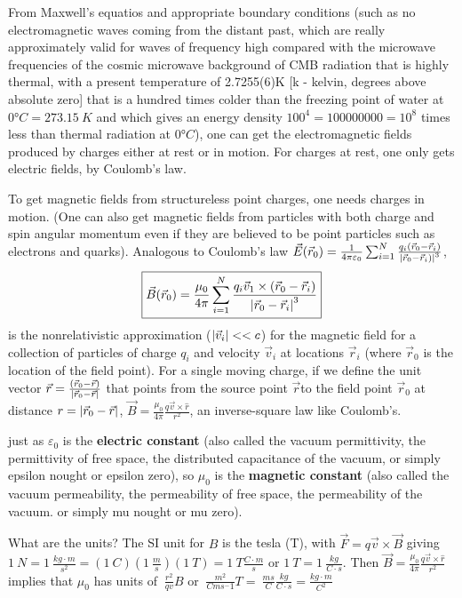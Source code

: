 From Maxwell's equatios and appropriate boundary conditions (such as no electromagnetic waves coming from the distant past, which are really approximately valid for waves of frequency high compared with the microwave frequencies of the cosmic microwave background of CMB radiation that is highly thermal, with a present temperature of 2.7255(6)K [k - kelvin, degrees above absolute zero] that is a hundred times colder than the freezing point of water at $\ang{0}C = \SI{273.15}{K}$ and which gives an energy density $100^4 = 100000000 = 10^8$ times less than thermal radiation at $\ang{0}C$), one can get the electromagnetic fields produced by charges either at rest or in motion. For charges at rest, one only gets electric fields, by Coulomb's law.

To get magnetic fields from structureless point charges, one needs charges in motion. (One can also get magnetic fields from particles with both charge and spin angular momentum even if they are believed to be point particles such as electrons and quarks). Analogous to Coulomb's law
$\vec{E}(\vec{r}_0) = \frac{1}{4 \pi \varepsilon_0} \sum_{i = 1}^{N} \frac{q_i(\vec{r}_0 - \vec{r}_i)}{\left| \vec{r}_0 - \vec{r}_i) \right|^3}$,
\begin{equation}
 \boxed{\vec{B}(\vec{r}_0) = \frac{\mu_0}{4 \pi} \sum_{i = 1}^{N} \frac{q_i \vec{v}_1 \times (\vec{r}_0 - \vec{r}_i)}{\left| \vec{r}_0 - \vec{r}_i \right|^3}}
 \end{equation} 
is the nonrelativistic approximation ($\left| \vec{v}_i \right| << c$) for the magnetic field for a collection of particles of charge $q_i$ and velocity $\vec{v}_i$ at locations $\vec{r}_i$ (where $\vec{r}_0$ is the location of the field point). For a single moving charge, if we define the unit vector $\vec{r} = \frac{(\vec{r}_0 - \vec{r})}{\left| \vec{r}_0 - \vec{r} \right|}$ that points from the source point $\vec{r}$to the field point $\vec{r}_0$ at distance $r = \left| \vec{r}_0 - \vec{r} \right|$, $\vec{B} = \frac{\mu_0}{4\pi} \frac{q\vec{v} \times \hat{r}}{r^2}$, an inverse-square law like Coulomb's.

just as $\varepsilon_0$ is the \textbf{electric constant} (also called the vacuum permittivity, the permittivity of free space, the distributed capacitance of the vacuum, or simply epsilon nought or epsilon zero), so $\mu_0$ is the \textbf{magnetic constant} (also called the vacuum permeability, the permeability of free space, the permeability of the vacuum. or simply mu nought or mu zero).

What are the units? The SI unit for $B$ is the tesla (T), with $\vec{F} = q \vec{v} \times \vec{B}$ giving $\SI{1}{N} = \SI{1}{\frac{kg \cdot m}{s^2}} = (\SI{1}{C})(\SI{1}{\frac{m}{s}})(\SI{1}{T}) = \SI{1}{T\frac{C \cdot m}{s}}$ or $\SI{1}{T} = \SI{1}{\frac{kg}{C \cdot s}}$. Then $\vec{B} = \frac{\mu_0}{4 \pi}\frac{q \vec{v} \times \hat{r}}{r^2}$ implies that $\mu_0$ has units of $\SI{}{\frac{r^2}{qv}B}$ or $\SI{}{\frac{m^2}{Cms^-1}T} = \SI{}{\frac{ms}{C} \frac{kg}{C \cdot s} = \frac{kg \cdot m}{C^2}}$

